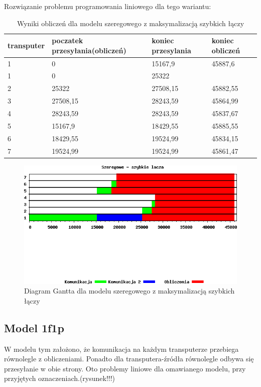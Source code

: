 \documentclass[a4paper,11pt, titlepage]{article}
\begin{document}
Rozwiązanie problemu programowania liniowego dla tego wariantu:
\begin{table}[hp!]
\begin{tabular}{|l|l|l|l|}\hline
transputer & poczatek przesyłania(obliczeń) & koniec przesylania & koniec obliczeń\\ \hline
1	&0			&15167,9	&45887,6\\ \hline
1	&0			&25322		&\\ \hline	
2	&25322		&27508,15	&45882,55\\ \hline
3	&27508,15	&28243,59	&45864,99\\ \hline
4	&28243,59	&28243,59	&45837,67\\ \hline
5	&15167,9	&18429,55	&45885,55\\ \hline
6	&18429,55	&19524,99	&45834,15\\ \hline
7	&19524,99	&19524,99	&45861,47\\ \hline
\end{tabular}
\caption{Wyniki obliczeń dla modelu szeregowego z maksymalizacją szybkich łączy \label{szeregowe_lt}}
\end{table}

\begin{figure}[h!]
\includegraphics[width=1.0\textwidth]{wykresy/szeregowe_lacza}
\caption{Diagram Gantta dla modelu szeregowego z maksymalizacją szybkich łączy \label{szeregowe_l}}
\end{figure}

\subsection{Model 1f1p}
W modelu tym założono, że komunikacja na każdym transputerze przebiega równolegle z obliczeniami. Ponadto dla transputera-źródła równolegle odbywa się przesyłanie w obie strony. Oto problemy liniowe dla omawianego modelu, przy przyjętych oznaczeniach.(rysunek!!!)
\end{document}
